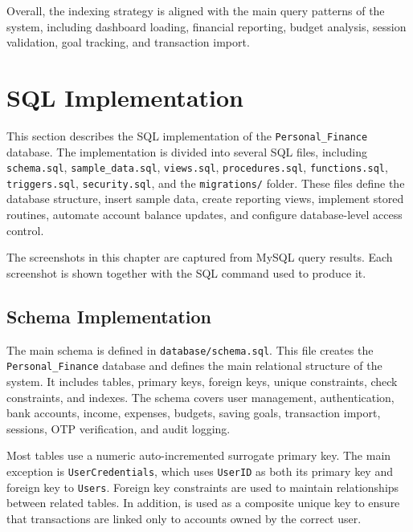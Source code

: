 ﻿\documentclass{article}
\begin{document}
Overall, the indexing strategy is aligned with the main query patterns of the system, including 
dashboard loading, financial reporting, budget analysis, session validation, goal tracking, and 
transaction import.

\section{SQL Implementation}
\label{sec:sql-implementation}

This section describes the SQL implementation of the \texttt{Personal\_Finance} database. 
The implementation is divided into several SQL files, including \texttt{schema.sql}, 
\texttt{sample\_data.sql}, \texttt{views.sql}, \texttt{procedures.sql}, 
\texttt{functions.sql}, \texttt{triggers.sql}, \texttt{security.sql}, and the 
\texttt{migrations/} folder. These files define the database structure, insert sample data, 
create reporting views, implement stored routines, automate account balance updates, and 
configure database-level access control.

The screenshots in this chapter are captured from MySQL query results. Each screenshot is 
shown together with the SQL command used to produce it.

\subsection{Schema Implementation}

The main schema is defined in \texttt{database/schema.sql}. This file creates the 
\texttt{Personal\_Finance} database and defines the main relational structure of the system. 
It includes tables, primary keys, foreign keys, unique constraints, check constraints, and 
indexes. The schema covers user management, authentication, bank accounts, income, expenses, 
budgets, saving goals, transaction import, sessions, OTP verification, and audit logging.

Most tables use a numeric auto-incremented surrogate primary key. The main exception is 
\texttt{UserCredentials}, which uses \texttt{UserID} as both its primary key and foreign key 
to \texttt{Users}. Foreign key constraints are used to maintain relationships between related 
tables. In addition,  is used as a composite unique key 
to ensure that transactions are linked only to accounts owned by the correct user.
\end{document}
